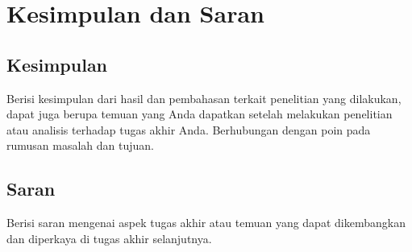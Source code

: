 \newpage
\chapter{Kesimpulan dan Saran}

\section{Kesimpulan}
Berisi kesimpulan dari hasil dan pembahasan terkait penelitian yang dilakukan, dapat juga berupa temuan yang Anda dapatkan setelah melakukan penelitian atau analisis terhadap tugas akhir Anda. Berhubungan dengan poin pada rumusan masalah dan tujuan. 

\section{Saran}
Berisi saran mengenai aspek tugas akhir atau temuan yang dapat dikembangkan dan diperkaya di tugas akhir selanjutnya. 